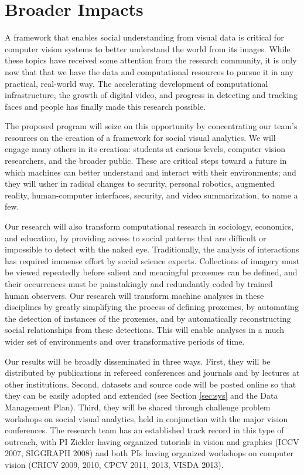 \vspace{-8pt}
\section{Broader Impacts}
\label{sec:impacts}
\vspace{-8pt}
A framework that enables social understanding from visual data is critical for computer vision systems to better understand the world from its images. While these topics have received some attention from the research community, it is only now that that we have the data and computational resources to pursue it in any practical, real-world way. The accelerating development of computational infrastructure, the growth of digital video, and progress in detecting and tracking faces and people has finally made this research possible.

The proposed program will seize on this opportunity by concentrating our team's resources on the creation of a framework for social visual analytics. We will engage many others in its creation: students at carious levels, computer vision researchers, and the broader public. These are critical steps toward a future in which machines can better understand and interact with their environments; and they will usher in radical changes to security, personal robotics, augmented reality, human-computer interfaces, security, and video summarization, to name a few.

Our research will also transform computational research in sociology, economics, and education, by providing access to social patterns that are difficult or impossible to detect with the naked eye. Traditionally, the analysis of interactions has required immense effort by social science experts. Collections of imagery must be viewed repeatedly before salient and meaningful proxemes can be defined, and their occurrences must be painstakingly and redundantly coded by trained human observers. Our research will transform machine analyses in these disciplines by greatly simplifying the process of defining proxemes, by automating the detection of instances of the proxemes, and by automatically reconstructing social relationships from these detections. This will enable analyses in a much wider set of environments and over transformative periods of time.

Our results will be broadly disseminated in three ways. First, they will be distributed by publications in refereed conferences and journals and by lectures at other institutions. Second, datasets and source code will be posted online so that they can be easily adopted and extended (see Section \ref{sec:sys} and the Data Management Plan). Third, they will be shared through challenge problem workshops on social visual analytics, held in conjunction with the major vision conferences. The research team has an established track record in this type of outreach, with PI Zickler having organized tutorials in vision and graphics (ICCV 2007, SIGGRAPH 2008) and both PIs having organized workshops on computer vision (CRICV 2009, 2010, CPCV 2011, 2013, VISDA 2013).


